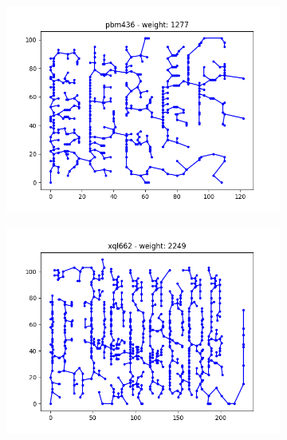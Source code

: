 \documentclass{article}
\def\v{0.4}
\begin{document}
\begin{figure}[h!]
\begin{subfigure}[b]{\v\linewidth}
		\includegraphics[width=\linewidth]{graphs/MST_pbm436.png}
	\end{subfigure}
	\begin{subfigure}[b]{\v\linewidth}
		\includegraphics[width=\linewidth]{graphs/MST_xql662.png}
	\end{subfigure}
\end{figure}

\clearpage
\end{document}
